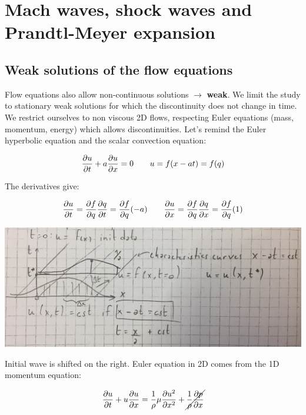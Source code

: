 
\chapter{Mach waves, shock waves and Prandtl-Meyer expansion}
\section{Weak solutions of the flow equations}
	Flow equations also allow non-continuous solutions $\rightarrow$ \textbf{weak}. We limit the study to stationary weak solutions for which the discontinuity does not change in time. We restrict ourselves to non viscous 2D flows, respecting Euler equations (mass, momentum, energy) which allows discontinuities. Let's remind the Euler hyperbolic equation and the scalar convection equation: 
	
	\begin{equation}
	\frac{\partial u}{\partial t} + a \frac{\partial u}{\partial x} = 0 \qquad u = f(x-at) = f(q)
	\end{equation}
	
	The derivatives give: 
	
	\begin{equation}
	\frac{\partial u}{\partial t} = \frac{\partial f}{\partial q} \frac{\partial q}{\partial t} = \frac{\partial f}{\partial q} (-a)\qquad \frac{\partial u}{\partial x} = \frac{\partial f}{\partial q} \frac{\partial q}{\partial x} = \frac{\partial f}{\partial q} (1)
	\end{equation}
	
	\begin{center}
	\includegraphics[scale=0.1]{ch8/7}
	\end{center}
	
	Initial wave is shifted on the right. Euler equation in 2D comes from the 1D momentum equation: 
	
	\begin{equation}
	\frac{\partial u}{\partial t} + u\frac{\partial u}{\partial x} = \frac{1}{\rho } \mu \frac{\partial u^2}{\partial  x^2} + \cancel{\frac{1}{\rho }\frac{\partial p}{\partial x}}
	\end{equation}
	

